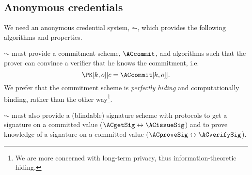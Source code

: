 \subsection{Anonymous credentials}%
\label{ZK-anon-cred}



We need an anonymous credential system, \(\AC\), which provides the following 
algorithms and properties.


\(\AC\) must provide a commitment scheme, \(\ACcommit\), and algorithms such 
that the prover can convince a verifier that he knows the commitment, i.e.
\begin{equation*}
  \PK[k, o][c = \ACcommit[k,o]].
\end{equation*}
We prefer that the commitment scheme is \emph{perfectly hiding} and 
computationally binding, rather than the other way\footnote{%
  We are more concerned with long-term privacy, thus information-theoretic 
  hiding.
}.


\(\AC\) must also provide a (blindable) signature scheme with protocols to get a 
signature on a committed value (\(\ACgetSig\leftrightarrow \ACissueSig\)) and to 
prove knowledge of a signature on a committed value 
(\(\ACproveSig\leftrightarrow \ACverifySig\)).

